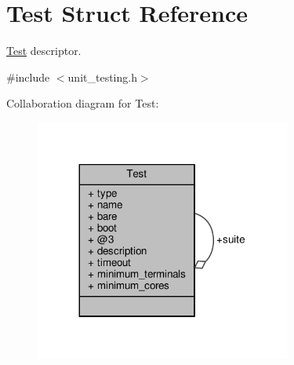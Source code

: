 \hypertarget{structTest}{}\section{Test Struct Reference}
\label{structTest}


\hyperlink{structTest}{Test} descriptor.  




{\ttfamily \#include $<$unit\+\_\+testing.\+h$>$}



Collaboration diagram for Test\+:
\nopagebreak
\begin{figure}[H]
\begin{center}
\leavevmode
\includegraphics[width=239pt]{structTest__coll__graph}
\end{center}
\end{figure}
